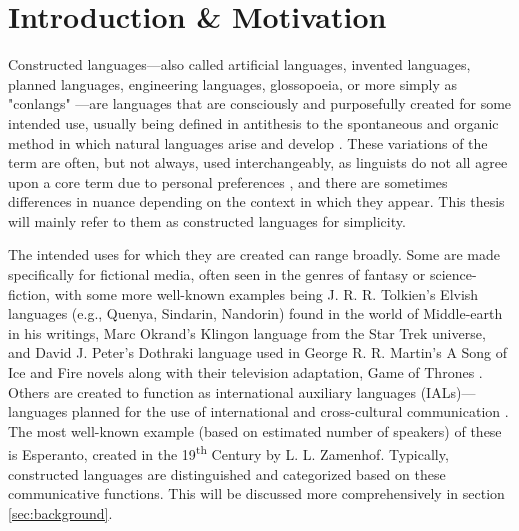 \documentclass[12pt,a4paper]{article}
\numberwithin{figure}{section}
\numberwithin{table}{section}
\numberwithin{definition}{section}
\begin{document}
\setcounter{page}{1}

\section{Introduction \& Motivation} 
\label{sec:intro}


Constructed languages---also called artificial languages, invented languages, planned languages, engineering languages, glossopoeia, or more simply as "conlangs" \parencite{douglas2015book}---are languages that are consciously and purposefully created for some intended use, usually being defined in antithesis to the spontaneous and organic method in which natural languages arise and develop \parencite{sanders2016article}. These variations of the term are often, but not always, used interchangeably, as linguists do not all agree upon a core term due to personal preferences \parencite{Adelman2014article}, and there are sometimes differences in nuance depending on the context in which they appear. This thesis will mainly refer to them as constructed languages for simplicity.

The intended uses for which they are created can range broadly. Some are made specifically for fictional media, often seen in the genres of fantasy or science-fiction, with some more well-known examples being J. R. R. Tolkien's Elvish languages (e.g., Quenya, Sindarin, Nandorin) found in the world of Middle-earth in his writings, Marc Okrand's Klingon language from the Star Trek universe, and David J. Peter's Dothraki language used in George R. R. Martin's A Song of Ice and Fire novels along with their television adaptation, Game of Thrones \parencite{punske2020book}. Others are created to function as international auxiliary languages (IALs)---languages planned for the use of international and cross-cultural communication \parencite{Gobbo2016article}. The most well-known example (based on estimated number of speakers) of these is Esperanto, created in the 19\textsuperscript{th} Century by L. L. Zamenhof. Typically, constructed languages are distinguished and categorized based on these communicative functions. This will be discussed more comprehensively in section \ref{sec:background}. 

\end{document}
